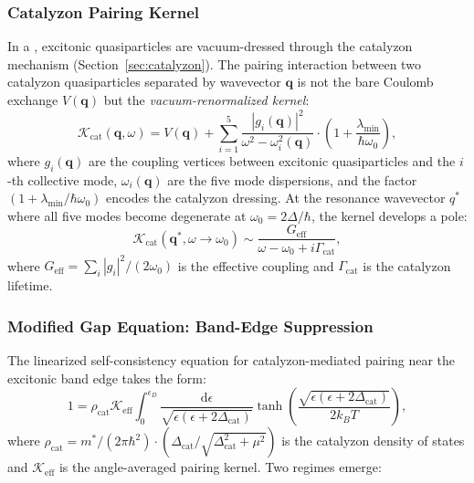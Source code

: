 \documentclass[11pt,letterpaper]{article}
\begin{document}
\subsubsection{Catalyzon Pairing Kernel}

In a \TEVC{}, excitonic quasiparticles are vacuum-dressed through the catalyzon mechanism (Section~\ref{sec:catalyzon}). The pairing interaction between two catalyzon quasiparticles separated by wavevector $\mathbf{q}$ is not the bare Coulomb exchange $V(\mathbf{q})$ but the \textit{vacuum-renormalized kernel}:
\begin{equation}
\mathcal{K}_{\text{cat}}(\mathbf{q}, \omega) = V(\mathbf{q}) + \sum_{i=1}^5 \frac{|g_i(\mathbf{q})|^2}{\omega^2 - \omega_i^2(\mathbf{q})} \cdot \left(1 + \frac{\lambda_{\min}}{\hbar\omega_0}\right),
\label{eq:pairing_kernel}
\end{equation}
where $g_i(\mathbf{q})$ are the coupling vertices between excitonic quasiparticles and the $i$-th collective mode, $\omega_i(\mathbf{q})$ are the five mode dispersions, and the factor $(1 + \lambda_{\min}/\hbar\omega_0)$ encodes the catalyzon dressing. At the resonance wavevector $q^*$ where all five modes become degenerate at $\omega_0 = 2\Delta/\hbar$, the kernel develops a pole:
\begin{equation}
\mathcal{K}_{\text{cat}}(\mathbf{q}^*, \omega \to \omega_0) \sim \frac{G_{\text{eff}}}{\omega - \omega_0 + i\Gamma_{\text{cat}}},
\end{equation}
where $G_{\text{eff}} = \sum_i |g_i|^2 / (2\omega_0)$ is the effective coupling and $\Gamma_{\text{cat}}$ is the catalyzon lifetime.

\subsubsection{Modified Gap Equation: Band-Edge Suppression}

The linearized self-consistency equation for catalyzon-mediated pairing near the excitonic band edge takes the form:
\begin{equation}
1 = \rho_{\text{cat}} \mathcal{K}_{\text{eff}} \int_0^{\epsilon_D} \frac{\mathrm{d}\epsilon}{\sqrt{\epsilon(\epsilon + 2\Delta_{\text{cat}})}} \tanh\left(\frac{\sqrt{\epsilon(\epsilon + 2\Delta_{\text{cat}})}}{2k_B T}\right),
\label{eq:modified_gap}
\end{equation}
where $\rho_{\text{cat}} = m^*/(2\pi\hbar^2) \cdot (\Delta_{\text{cat}}/\sqrt{\Delta_{\text{cat}}^2 + \mu^2})$ is the catalyzon density of states and $\mathcal{K}_{\text{eff}}$ is the angle-averaged pairing kernel. Two regimes emerge:
\end{document}

